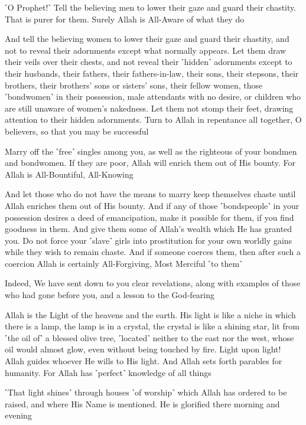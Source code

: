 ˹O Prophet!˺ Tell the believing men to lower their gaze and guard their chastity. That is purer for them. Surely Allah is All-Aware of what they do

And tell the believing women to lower their gaze and guard their chastity, and not to reveal their adornments except what normally appears. Let them draw their veils over their chests, and not reveal their ˹hidden˺ adornments except to their husbands, their fathers, their fathers-in-law, their sons, their stepsons, their brothers, their brothers’ sons or sisters’ sons, their fellow women, those ˹bondwomen˺ in their possession, male attendants with no desire, or children who are still unaware of women’s nakedness. Let them not stomp their feet, drawing attention to their hidden adornments. Turn to Allah in repentance all together, O believers, so that you may be successful

Marry off the ˹free˺ singles among you, as well as the righteous of your bondmen and bondwomen. If they are poor, Allah will enrich them out of His bounty. For Allah is All-Bountiful, All-Knowing

And let those who do not have the means to marry keep themselves chaste until Allah enriches them out of His bounty. And if any of those ˹bondspeople˺ in your possession desires a deed of emancipation, make it possible for them, if you find goodness in them. And give them some of Allah’s wealth which He has granted you. Do not force your ˹slave˺ girls into prostitution for your own worldly gains while they wish to remain chaste. And if someone coerces them, then after such a coercion Allah is certainly All-Forgiving, Most Merciful ˹to them˺

Indeed, We have sent down to you clear revelations, along with examples of those who had gone before you, and a lesson to the God-fearing

Allah is the Light of the heavens and the earth. His light is like a niche in which there is a lamp, the lamp is in a crystal, the crystal is like a shining star, lit from ˹the oil of˺ a blessed olive tree, ˹located˺ neither to the east nor the west, whose oil would almost glow, even without being touched by fire. Light upon light! Allah guides whoever He wills to His light. And Allah sets forth parables for humanity. For Allah has ˹perfect˺ knowledge of all things

˹That light shines˺ through houses ˹of worship˺ which Allah has ordered to be raised, and where His Name is mentioned. He is glorified there morning and evening

